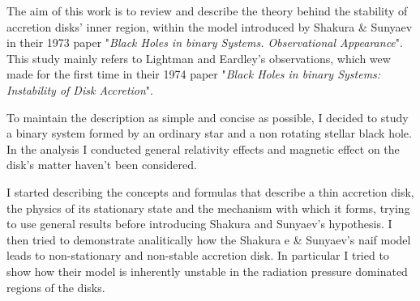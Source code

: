 \documentclass[a4paper]{article}
\begin{document}
The aim of this work is to review and describe the theory behind the stability of accretion disks' inner region, within the model introduced by Shakura \& Sunyaev in their 1973 paper "\textit{Black Holes in binary Systems. Observational Appearance}". This study mainly refers to Lightman and Eardley's observations, which wew made for the first time in their 1974 paper "\textit{Black Holes in binary Systems: Instability of Disk Accretion}".

To maintain the description as simple and concise as possible, I decided to study a binary system formed by an ordinary star and a non rotating stellar black hole.
In the analysis I conducted general relativity effects and magnetic effect on the disk's matter haven't been considered.

I started describing the concepts and formulas that describe a thin accretion disk, the physics of its stationary state and the mechanism with which it forms, trying to use general results before introducing Shakura and Sunyaev's hypothesis.
I then tried to demonstrate analitically how the Shakura e \& Sunyaev's naif model leads to non-stationary and non-stable accretion disk. In particular I tried to show how their model is inherently unstable in the radiation pressure dominated regions of the disks.
\end{document}

